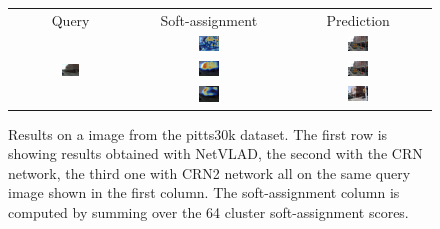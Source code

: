 \documentclass[10pt,twocolumn,letterpaper]{article}
\begin{document}
\begin{figure}
   \centering
   \setlength{\tabcolsep}{-0.1pt}   %
   \addtolength{\tabcolsep}{-0.1pt} %
   \def\arraystretch{0.2}
   \begin{tabular}{ccc}
      Query & Soft-assignment & Prediction\\
            & \includegraphics[width=0.15\textwidth]{img/results/29/29_NETVLAD_Cam_On_Image.png} & \includegraphics[width=0.15\textwidth]{img/results/29/29_NETVLAD_best_pred.png}\\
      \includegraphics[width=0.15\textwidth]{img/results/29/29_query.png} & \includegraphics[width=0.15\textwidth]{img/results/29/29_CRN_Cam_On_Image.png} &  \includegraphics[width=0.15\textwidth]{img/results/29/29_CRN_best_pred.png}\\
            & \includegraphics[width=0.15\textwidth]{img/results/29/29_CRN2_Cam_On_Image.png}    & \includegraphics[width=0.15\textwidth]{img/results/29/29_CRN2_best_pred.png}
   \end{tabular}
   \caption{Results on a image from the pitts30k dataset. The first row is showing results obtained with NetVLAD, the second with the CRN network, the third one with CRN2 network all on the same query image shown in the first column.
   The soft-assignment column is computed by summing over the 64 cluster soft-assignment scores. }
   \label{fig:visual}
\end{figure}
	
\end{document}

